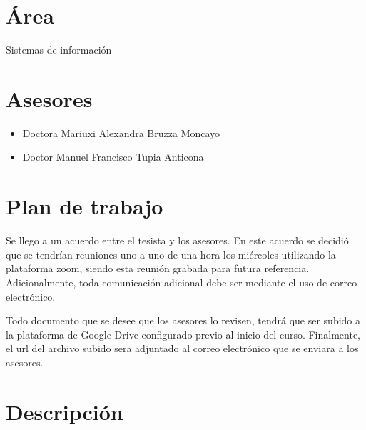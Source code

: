 \documentclass{article}
\begin{document}


\section{Área}
Sistemas de información

\section{Asesores}
\begin{itemize}
    \item{Doctora Mariuxi Alexandra Bruzza Moncayo}
    \item{Doctor Manuel Francisco Tupia Anticona}
\end{itemize}

\section{Plan de trabajo}

Se llego a un acuerdo entre el tesista y los asesores. En este acuerdo se decidió
que se tendrían reuniones uno a uno de una hora los miércoles utilizando la
plataforma zoom, siendo esta reunión grabada para futura referencia.
Adicionalmente, toda comunicación adicional debe ser mediante el uso de correo electrónico.

Todo documento que se desee que los asesores lo revisen, tendrá que ser subido
a la plataforma de Google Drive configurado previo al inicio del curso. Finalmente,
el url del archivo subido sera adjuntado al correo electrónico que se enviara a
los asesores.



\newpage

\section{Descripción}
\end{document}
